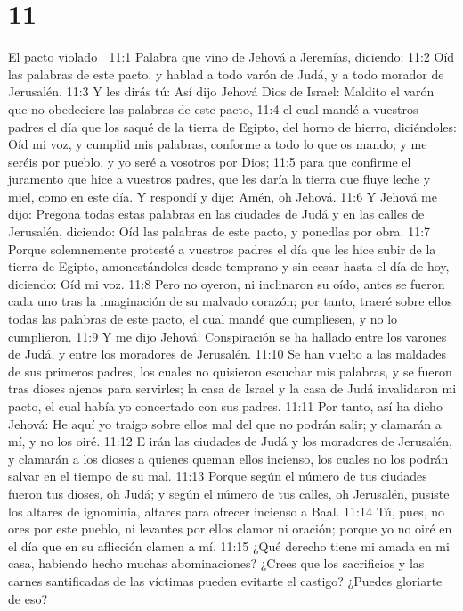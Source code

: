 \chapter{11}

El pacto violado  

11:1 Palabra que vino de Jehová a Jeremías, diciendo:  
11:2 Oíd las palabras de este pacto, y hablad a todo varón de Judá, y a todo morador de Jerusalén.  
11:3 Y les dirás tú: Así dijo Jehová Dios de Israel: Maldito el varón que no obedeciere las palabras de este pacto,  
11:4 el cual mandé a vuestros padres el día que los saqué de la tierra de Egipto, del horno de hierro, diciéndoles: Oíd mi voz, y cumplid mis palabras, conforme a todo lo que os mando; y me seréis por pueblo, y yo seré a vosotros por Dios;  
11:5 para que confirme el juramento que hice a vuestros padres, que les daría la tierra que fluye leche y miel, como en este día. Y respondí y dije: Amén, oh Jehová.  
11:6 Y Jehová me dijo: Pregona todas estas palabras en las ciudades de Judá y en las calles de Jerusalén, diciendo: Oíd las palabras de este pacto, y ponedlas por obra.  
11:7 Porque solemnemente protesté a vuestros padres el día que les hice subir de la tierra de Egipto, amonestándoles desde temprano y sin cesar hasta el día de hoy, diciendo: Oíd mi voz.  
11:8 Pero no oyeron, ni inclinaron su oído, antes se fueron cada uno tras la imaginación de su malvado corazón; por tanto, traeré sobre ellos todas las palabras de este pacto, el cual mandé que cumpliesen, y no lo cumplieron.  
11:9 Y me dijo Jehová: Conspiración se ha hallado entre los varones de Judá, y entre los moradores de Jerusalén.  
11:10 Se han vuelto a las maldades de sus primeros padres, los cuales no quisieron escuchar mis palabras, y se fueron tras dioses ajenos para servirles; la casa de Israel y la casa de Judá invalidaron mi pacto, el cual había yo concertado con sus padres.  
11:11 Por tanto, así ha dicho Jehová: He aquí yo traigo sobre ellos mal del que no podrán salir; y clamarán a mí, y no los oiré.  
11:12 E irán las ciudades de Judá y los moradores de Jerusalén, y clamarán a los dioses a quienes queman ellos incienso, los cuales no los podrán salvar en el tiempo de su mal.  
11:13 Porque según el número de tus ciudades fueron tus dioses, oh Judá; y según el número de tus calles, oh Jerusalén, pusiste los altares de ignominia, altares para ofrecer incienso a Baal.  
11:14 Tú, pues, no ores por este pueblo, ni levantes por ellos clamor ni oración; porque yo no oiré en el día que en su aflicción clamen a mí.  
11:15 ¿Qué derecho tiene mi amada en mi casa, habiendo hecho muchas abominaciones? ¿Crees que los sacrificios y las carnes santificadas de las víctimas pueden evitarte el castigo? ¿Puedes gloriarte de eso?  
